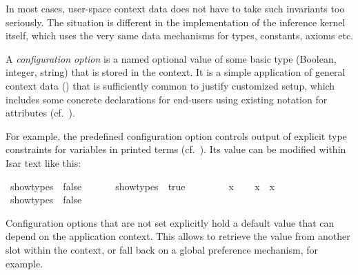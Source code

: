 \begin{isabellebody}
\begin{isamarkuptext}
  In most cases, user-space context data does not have to take such
  invariants too seriously.  The situation is different in the
  implementation of the inference kernel itself, which uses the very
  same data mechanisms for types, constants, axioms etc.%
\end{isamarkuptext}%
\isamarkuptrue%
%
\isamarkuptrue%
%
\begin{isamarkuptext}%
A \emph{configuration option} is a named optional value of
  some basic type (Boolean, integer, string) that is stored in the
  context.  It is a simple application of general context data
  () that is sufficiently common to justify
  customized setup, which includes some concrete declarations for
  end-users using existing notation for attributes (cf.\
  ).

  For example, the predefined configuration option \hyperlink{attribute.show-types}{\mbox{}} controls output of explicit type constraints for
  variables in printed terms (cf.\ \secref{sec:read-print}).  Its
  value can be modified within Isar text like this:%
\end{isamarkuptext}%
\isamarkuptrue%
\isamarkupfalse%
\ {\isacharbrackleft}{\isacharbrackleft}show{\isacharunderscore}types\ {\isacharequal}\ false{\isacharbrackright}{\isacharbrackright}\isanewline
\ \ %
\isanewline
\isanewline
{}\isamarkupfalse%
\isanewline
%
\isadelimproof
\ \ %
\endisadelimproof
%
\isatagproof
{}\isamarkupfalse%
\ {\isacharbrackleft}{\isacharbrackleft}show{\isacharunderscore}types\ {\isacharequal}\ true{\isacharbrackright}{\isacharbrackright}\isanewline
\ \ \ \ %
%
\endisatagproof
{\isafoldproof}%
%
\isadelimproof
\isanewline
%
\endisadelimproof
\ \ \isamarkupfalse%
\ x\isanewline
%
\isadelimproof
\isanewline
\ \ %
\endisadelimproof
%
\isatagproof
{}\isamarkupfalse%
\ {\isachardoublequoteopen}x\ {\isacharequal}\ x{\isachardoublequoteclose}\isanewline
\ \ \ \ \isacommand{using}\isamarkupfalse%
\ {\isacharbrackleft}{\isacharbrackleft}show{\isacharunderscore}types\ {\isacharequal}\ false{\isacharbrackright}{\isacharbrackright}\isanewline
\ \ \ \ \ \ %
\isanewline
\ \ \ \ \isacommand{{\isachardot}{\isachardot}}\isamarkupfalse%
\isanewline
{}\isamarkupfalse%
%
\endisatagproof
{\isafoldproof}%
%
\isadelimproof
%
\endisadelimproof
%
\begin{isamarkuptext}%
Configuration options that are not set explicitly hold a
  default value that can depend on the application context.  This
  allows to retrieve the value from another slot within the context,
  or fall back on a global preference mechanism, for example.


\end{isamarkuptext}
\end{isabellebody}
